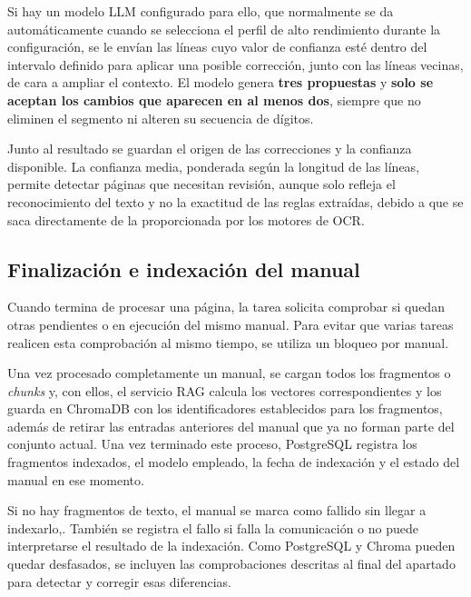 Si hay un modelo \ac{LLM} configurado para ello, que
normalmente se da automáticamente cuando se selecciona el perfil
de alto rendimiento durante la configuración, se le envían las
líneas cuyo valor de confianza esté dentro del intervalo definido para aplicar una posible corrección, junto con las líneas vecinas, de cara a ampliar el contexto. El modelo genera \textbf{tres propuestas}
y \textbf{solo se aceptan los cambios que aparecen en al menos dos}, siempre que no
eliminen el segmento ni alteren su secuencia de dígitos.

Junto al resultado se guardan el origen de las correcciones y la confianza
disponible. La confianza media, ponderada según la longitud de las líneas,
permite detectar páginas que necesitan revisión, aunque solo refleja el
reconocimiento del texto y no la exactitud de las reglas extraídas, debido a que se saca directamente de la proporcionada
por los motores de \ac{OCR}.


\FloatBarrier

\subsection{Finalización e indexación del manual}

Cuando termina de procesar una página, la tarea solicita
comprobar si quedan otras pendientes o en ejecución del mismo
manual. Para evitar que varias tareas realicen esta comprobación al mismo tiempo, se utiliza un bloqueo por manual.

Una vez procesado completamente un manual, se cargan todos los fragmentos o \textit{chunks} y, con ellos, el servicio \ac{RAG} calcula los
vectores correspondientes y los guarda en ChromaDB con los identificadores establecidos para
los fragmentos, además de retirar las entradas anteriores del manual que ya
no forman parte del conjunto actual. Una vez terminado este proceso,
PostgreSQL registra los fragmentos indexados, el modelo empleado, la fecha
de indexación y el estado del manual en ese momento.

Si no hay fragmentos de texto, el manual se marca como fallido sin llegar a indexarlo,. También se registra el fallo si falla la comunicación o no
puede interpretarse el resultado de la indexación. Como PostgreSQL y Chroma
pueden quedar desfasados, se incluyen las comprobaciones descritas al final
del apartado para detectar y corregir esas diferencias.

